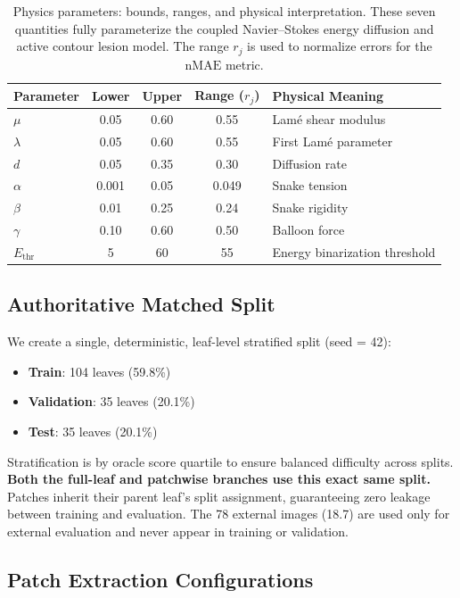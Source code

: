 \documentclass[11pt,a4paper]{article}
\newcommand{\nMAE}{\mathrm{nMAE}}
\begin{document}
\begin{table}[h]
\centering
\caption{Physics parameters: bounds, ranges, and physical interpretation. These seven quantities fully parameterize the coupled Navier--Stokes energy diffusion and active contour lesion model. The range $r_j$ is used to normalize errors for the $\nMAE$ metric.}
\label{tab:params}
\begin{tabular}{lcccl}
\toprule
Parameter & Lower & Upper & Range ($r_j$) & Physical Meaning \\
\midrule
$\mu$           & 0.05  & 0.60  & 0.55  & Lam\'{e} shear modulus \\
$\lambda$       & 0.05  & 0.60  & 0.55  & First Lam\'{e} parameter \\
$d$             & 0.05  & 0.35  & 0.30  & Diffusion rate \\
$\alpha$        & 0.001 & 0.05  & 0.049 & Snake tension \\
$\beta$         & 0.01  & 0.25  & 0.24  & Snake rigidity \\
$\gamma$        & 0.10  & 0.60  & 0.50  & Balloon force \\
$E_\mathrm{thr}$ & 5   & 60    & 55    & Energy binarization threshold \\
\bottomrule
\end{tabular}
\end{table}

\subsection{Authoritative Matched Split}

We create a single, deterministic, leaf-level stratified split (seed = 42):
\begin{itemize}[nosep]
    \item \textbf{Train}: 104 leaves (59.8\%)
    \item \textbf{Validation}: 35 leaves (20.1\%)
    \item \textbf{Test}: 35 leaves (20.1\%)
\end{itemize}
Stratification is by oracle score quartile to ensure balanced difficulty across splits.
\textbf{Both the full-leaf and patchwise branches use this exact same split.}
Patches inherit their parent leaf's split assignment, guaranteeing zero leakage between training and evaluation.
The 78 external images (18.7) are used only for external evaluation and never appear in training or validation.

\subsection{Patch Extraction Configurations}
\end{document}
